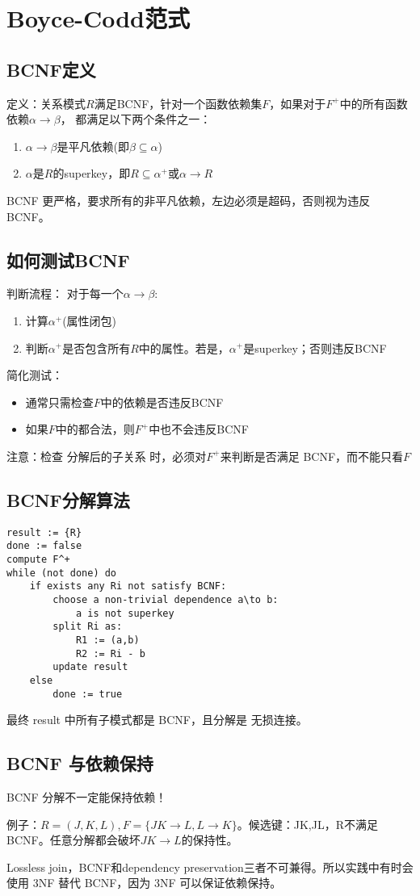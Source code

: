 \section{Boyce-Codd范式}

\subsection{BCNF定义}

定义：关系模式$R$满足BCNF，针对一个函数依赖集$F$，如果对于$F^+$中的所有函数依赖$\alpha\to\beta$，
都满足以下两个条件之一：
\begin{enumerate}
    \item $\alpha\to\beta$是平凡依赖(即$\beta\subseteq\alpha$)
    \item $\alpha$是$R$的superkey，即$R\subseteq\alpha^+$或$\alpha\to R$
\end{enumerate}

BCNF 更严格，要求所有的非平凡依赖，左边必须是超码，否则视为违反 BCNF。

\subsection{如何测试BCNF}

判断流程：
对于每一个$\alpha\to\beta$:
\begin{enumerate}
    \item 计算$\alpha^+$(属性闭包)
    \item 判断$\alpha^+$是否包含所有$R$中的属性。若是，$\alpha^+$是superkey；否则违反BCNF
\end{enumerate}

简化测试：
\begin{itemize}
    \item 通常只需检查$F$中的依赖是否违反BCNF
    \item 如果$F$中的都合法，则$F^+$中也不会违反BCNF
\end{itemize}

注意：检查 分解后的子关系 时，必须对$F^+$来判断是否满足 BCNF，而不能只看$F$

\subsection{BCNF分解算法}

\begin{lstlisting}[style=cppstyle]
result := {R}
done := false
compute F^+
while (not done) do 
    if exists any Ri not satisfy BCNF:
        choose a non-trivial dependence a\to b:
            a is not superkey
        split Ri as:
            R1 := (a,b)
            R2 := Ri - b
        update result
    else
        done := true   
\end{lstlisting}

最终 result 中所有子模式都是 BCNF，且分解是 无损连接。

\subsection{BCNF 与依赖保持}

BCNF 分解不一定能保持依赖！

例子：$R=(J,K,L),F=\{JK\to L,L\to K\}$。候选键：JK,JL，R不满足BCNF。任意分解都会破坏$JK\to L$的保持性。

Lossless join，BCNF和dependency preservation三者不可兼得。所以实践中有时会使用 3NF 替代 BCNF，因为 3NF 可以保证依赖保持。


